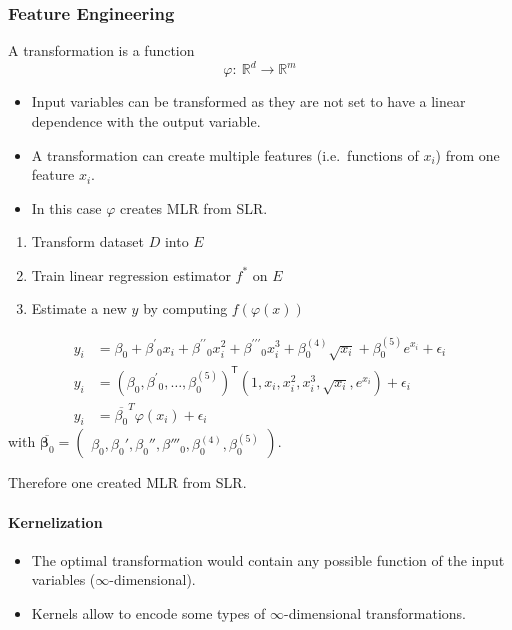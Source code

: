 \subsubsection{Feature Engineering}

A transformation is a function
\begin{equation*}
    \varphi{:}\:\mathbb{R}^d\to\mathbb{R}^m
\end{equation*}

\begin{itemize}
    \item Input variables can be transformed as they are not set to have a linear dependence with the output variable.
    \item A transformation can create multiple features (i.e.\ functions of $x_i$) from one feature $x_i$.
    \item In this case $\varphi$ creates MLR from SLR.
\end{itemize}


\begin{enumerate}
    \item Transform dataset $D$ into $E$
    \item Train linear regression estimator $f^*$ on $E$
    \item Estimate a new $y$ by computing $f(\varphi(x))$
\end{enumerate}


\noindent\begin{align*}
    y_i & =\beta_0+\beta^{\prime}{}_0x_i+\beta^{\prime\prime}{}_0x_i^2+\beta^{\prime\prime\prime}{}_0x_i^3+\beta_0^{(4)}\sqrt{x_i}+\beta_0^{(5)}e^{x_i}+\epsilon_i \\
    y_i & ={\left(\beta_0,\beta^{\prime}{}_0,\dots,\beta_0^{(5)}\right)}^{\mathsf{T}}\left(1,x_i,x_i^2,x_i^3,\sqrt{x_i},e^{x_i}\right)+\epsilon_i                  \\
    y_i & =\overline{\beta_0}^T\varphi(x_i)+\epsilon_i
\end{align*}
with $\overline{\boldsymbol{\beta}_0}=\begin{pmatrix}\beta_0,\beta_0',\beta_0'',\beta'''_0,\beta_0^{(4)},\beta_0^{(5)}\end{pmatrix}$. %

Therefore one created MLR from SLR.

\paragraph{Kernelization}
\begin{itemize}
    \item The optimal transformation would contain any possible function of the input variables ($\infty$-dimensional).
    \item Kernels allow to encode some types of $\infty$-dimensional transformations.
\end{itemize}

